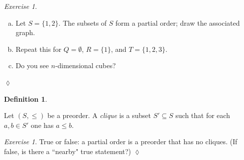 \documentclass{book}
\def\ss{\subseteq}
\theoremstyle{remark}
\newtheorem{exc}[subsubsection]{Exercise}
\newenvironment{exercise}{\begin{exc}}{\hspace*{\fill}$\lozenge$\end{exc}}
\theoremstyle{definition}
\newtheorem{definition}[subsubsection]{Definition}
\def\sexc{\begin{enumerate}[a.)]\setlength{\itemsep}{.1cm}\setlength{\parskip}{.1cm}\item}
\def\next{\item}
\def\endsexc{\end{enumerate}}
\begin{document}
\begin{exercise}\label{exc:power poset}~
\sexc Let $S=\{1,2\}$. The subsets of $S$ form a partial order; draw the associated graph. 
\next Repeat this for $Q=\emptyset$, $R=\{1\}$, and $T=\{1,2,3\}$. 
\next Do you see $n$-dimensional cubes?
\endsexc
\end{exercise}

\begin{definition}\label{def:clique}

Let $(S,\leq)$ be a preorder. A {\em clique} is a subset $S'\ss S$ such that for each $a,b\in S'$ one has $a\leq b$.

\end{definition}

\begin{exercise}
True or false: a partial order is a preorder that has no cliques. (If false, is there a ``nearby" true statement?)
\end{exercise}
\end{document}
